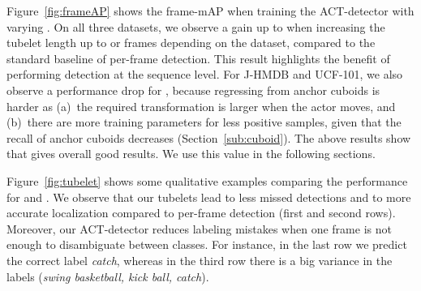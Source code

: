 \documentclass[10pt,twocolumn,letterpaper]{article}
\begin{document}
\begin{table}[t]
\centering
{}
\vspace{1mm}
\caption{Frame-mAP for slow, medium and fast moving actors. }
\label{table:largedisplacements}
\vspace{-5mm}
\end{table}


Figure~\ref{fig:frameAP} shows the frame-mAP when training the ACT-detector with varying . On all three datasets, we observe a gain up to  when increasing the tubelet length up to  or  frames depending on the dataset, compared to the standard baseline of per-frame detection. This result highlights the benefit of performing detection at the sequence level. For J-HMDB and UCF-101, we also observe a performance drop for , because 
regressing from anchor cuboids is harder as (a)~the required transformation is larger when the actor moves, and (b)~there are more training parameters for less positive samples, given that the recall of anchor cuboids decreases (Section~\ref{sub:cuboid}).
The above results show that  gives overall good results. 
We use this value in the following sections. 

Figure~\ref{fig:tubelet} shows some qualitative examples comparing the performance for  and .  
We observe that our tubelets lead to less missed detections and to more accurate localization compared to per-frame detection (first and second rows). 
Moreover, our ACT-detector reduces labeling mistakes when one frame is not enough to disambiguate between classes. 
For instance, in the last row we predict the correct label \textit{catch}, whereas in the third row there is a big variance in the labels (\textit{swing basketball, kick ball, catch}). 
\end{document}
